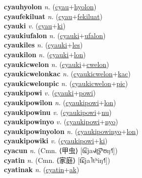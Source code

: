 \textbf{cyauhyolon} \textit{n.} (\hyperref[cyau]{cyau}+\hyperref[hyolon]{hyolon})
 \label{cyauhyolon} \\
\textbf{cyaufekiluat} \textit{n.} (\hyperref[cyau]{cyau}+\hyperref[fekiluat]{fekiluat})
 \label{cyaufekiluat} \\
\textbf{cyauki} \textit{v.} (\hyperref[cyau]{cyau}+\hyperref[ki]{ki})
 \label{cyauki} \\
\textbf{cyaukiufalon} \textit{n.} (\hyperref[cyauki]{cyauki}+\hyperref[ufalon]{ufalon})
 \label{cyaukiufalon} \\
\textbf{cyaukiles} \textit{n.} (\hyperref[cyauki]{cyauki}+\hyperref[les]{les})
 \label{cyaukiles} \\
\textbf{cyaukilon} \textit{n.} (\hyperref[cyauki]{cyauki}+\hyperref[lon]{lon})
 \label{cyaukilon} \\
\textbf{cyaukicwelon} \textit{n.} (\hyperref[cyauki]{cyauki}+\hyperref[cwelon]{cwelon})
 \label{cyaukicwelon} \\
\textbf{cyaukicwelonkac} \textit{n.} (\hyperref[cyaukicwelon]{cyaukicwelon}+\hyperref[kac]{kac})
 \label{cyaukicwelonkac} \\
\textbf{cyaukicwelonpic} \textit{n.} (\hyperref[cyaukicwelon]{cyaukicwelon}+\hyperref[pic]{pic})
 \label{cyaukicwelonpic} \\
\textbf{cyaukipowi} \textit{v.} (\hyperref[cyauki]{cyauki}+\hyperref[powi]{powi})
 \label{cyaukipowi} \\
\textbf{cyaukipowilon} \textit{n.} (\hyperref[cyaukipowi]{cyaukipowi}+\hyperref[lon]{lon})
 \label{cyaukipowilon} \\
\textbf{cyaukipowinu} \textit{v.} (\hyperref[cyaukipowi]{cyaukipowi}+\hyperref[nu]{nu})
 \label{cyaukipowinu} \\
\textbf{cyaukipowinyo} \textit{v.} (\hyperref[cyaukipowi]{cyaukipowi}+\hyperref[nyo]{nyo})
 \label{cyaukipowinyo} \\
\textbf{cyaukipowinyolon} \textit{n.} (\hyperref[cyaukipowinyo]{cyaukipowinyo}+\hyperref[lon]{lon})
 \label{cyaukipowinyolon} \\
\textbf{cyaukipowiki} \textit{v.} (\hyperref[cyaukipowi]{cyaukipowi}+\hyperref[ki]{ki})
 \label{cyaukipowiki} \\
\textbf{cyacun} \textit{n.} (Cmn. ⟨甲虫⟩ [t͡ɕja˧˩˧ʈ͡ʂʰʊŋ˧˥])
 \label{cyacun} \\
\textbf{cyatin} \textit{n.} (Cmn. ⟨家庭⟩ [t͡ɕja˥tʰiŋ˧˥])
 \label{cyatin} \\
\textbf{cyatinak} \textit{n.} (\hyperref[cyatin]{cyatin}+\hyperref[ak]{ak})
 \label{cyatinak} \\
